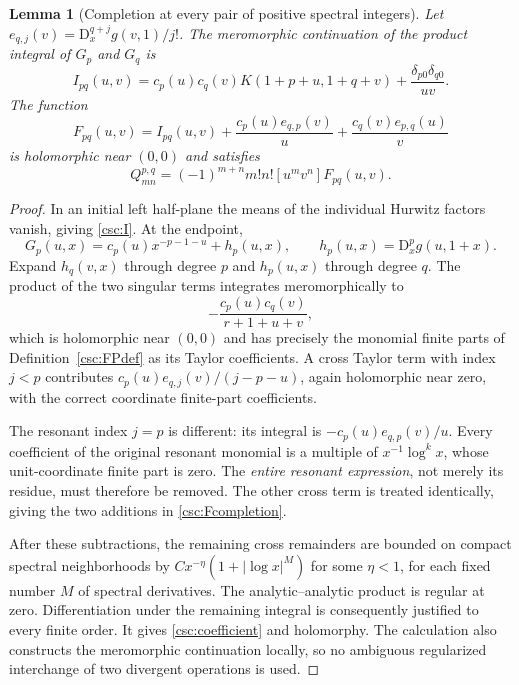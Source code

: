 \documentclass[11pt,a4paper]{article}
\numberwithin{equation}{section}
\newtheorem{lemma}[theorem]{Lemma}
\theoremstyle{definition}
\newcommand{\D}{\mathrm D}
\begin{document}
\begin{lemma}[Completion at every pair of positive spectral integers]\label{csc:completion}
Let $e_{q,j}(v)=\D_x^{q+j}g(v,1)/j!$. The meromorphic continuation of the product integral of $G_p$ and $G_q$ is
\begin{equation}\label{csc:I}
I_{pq}(u,v)=c_p(u)c_q(v)K(1+p+u,1+q+v)+\frac{\delta_{p0}\delta_{q0}}{uv}.
\end{equation}
The function
\begin{equation}\label{csc:Fcompletion}
F_{pq}(u,v)=I_{pq}(u,v)
+\frac{c_p(u)e_{q,p}(v)}u
+\frac{c_q(v)e_{p,q}(u)}v
\end{equation}
is holomorphic near $(0,0)$ and satisfies
\begin{equation}\label{csc:coefficient}
Q_{mn}^{p,q}=(-1)^{m+n}m!n![u^mv^n]F_{pq}(u,v).
\end{equation}
\end{lemma}
\begin{proof}
In an initial left half-plane the means of the individual Hurwitz factors vanish, giving \eqref{csc:I}. At the endpoint,
\[
G_p(u,x)=c_p(u)x^{-p-1-u}+h_p(u,x),\qquad h_p(u,x)=\D_x^pg(u,1+x).
\]
Expand $h_q(v,x)$ through degree $p$ and $h_p(u,x)$ through degree $q$. The product of the two singular terms integrates meromorphically to
\[
-\frac{c_p(u)c_q(v)}{r+1+u+v},
\]
which is holomorphic near $(0,0)$ and has precisely the monomial finite parts of Definition~\ref{csc:FPdef} as its Taylor coefficients. A cross Taylor term with index $j<p$ contributes
$c_p(u)e_{q,j}(v)/(j-p-u)$, again holomorphic near zero, with the correct coordinate finite-part coefficients.

The resonant index $j=p$ is different: its integral is
$-c_p(u)e_{q,p}(v)/u$. Every coefficient of the original resonant monomial is a multiple of $x^{-1}\log^k x$, whose unit-coordinate finite part is zero. The \emph{entire resonant expression}, not merely its residue, must therefore be removed. The other cross term is treated identically, giving the two additions in \eqref{csc:Fcompletion}.

After these subtractions, the remaining cross remainders are bounded on compact spectral neighborhoods by $C x^{-\eta}(1+|\log x|^M)$ for some $\eta<1$, for each fixed number $M$ of spectral derivatives. The analytic--analytic product is regular at zero. Differentiation under the remaining integral is consequently justified to every finite order. It gives \eqref{csc:coefficient} and holomorphy. The calculation also constructs the meromorphic continuation locally, so no ambiguous regularized interchange of two divergent operations is used.
\end{proof}
\end{document}
